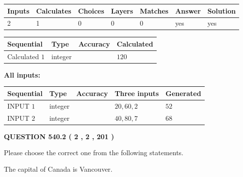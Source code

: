 \documentclass[12pt]{article}
\begin{document}
 

 
   
   
   
   
\noindent\begin{tabular}{|l|l|l|l|l|l|l|}
 \hline
Inputs & Calculates & Choices & Layers & Matches & Answer & Solution \\ \hline
 2  & 
 1  & 
 0
  & 
 0  & 
 0  & 
  yes & 
  yes 
  \\ \hline
 \end{tabular}
   
   
   
   
\noindent{}
   
   
  
  
\noindent\begin{tabular}{|l|l|l|l|}
\hline
 Sequential & Type & Accuracy & Calculated \\ 
\hline
 
 
  Calculated $  1 $ & integer &  & 
  $ 120 $ 
 \\  \hline  
 \end{tabular}
   
   
   
   
\noindent\vspace{0.1in}\hspace{-0.08in} {\textbf{\Large{All inputs: }}}
   
   
  
  
\noindent\begin{tabular}{|l|l|l|l|l|}
\hline
 Sequential & Type & Accuracy & Three inputs & Generated \\ 
\hline
 
 
  INPUT $  1 $ & integer &  & $
 20
 , 
 60
 , 
 2
 $ & $ 52 $ 
 \\  \hline  
 
 
  INPUT $  2 $ & integer &  & $
 40
 , 
 80
 , 
 7
 $ & $ 68 $ 
 \\  \hline  
 \end{tabular}
   
   
  
\vspace{0.2in}
  
{\textbf{\Large{QUESTION
540.2 
 ( 2 , 2 , 201 )
}}}
  
  
Please choose the correct one from the following statements.
 
 
The capital of Canada is Vancouver.
 
\end{document}
